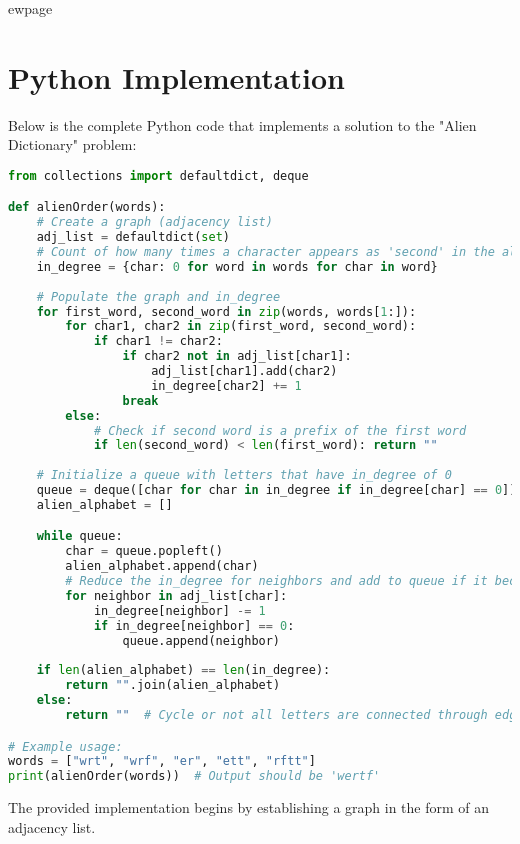 ewpage %
\section*{Python Implementation}
Below is the complete Python code that implements a solution to the "Alien Dictionary" problem:

\begin{fullwidth}
\begin{lstlisting}[language=Python]
from collections import defaultdict, deque

def alienOrder(words):
    # Create a graph (adjacency list)
    adj_list = defaultdict(set)
    # Count of how many times a character appears as 'second' in the alien dictionary order
    in_degree = {char: 0 for word in words for char in word}
    
    # Populate the graph and in_degree
    for first_word, second_word in zip(words, words[1:]):
        for char1, char2 in zip(first_word, second_word):
            if char1 != char2:
                if char2 not in adj_list[char1]:
                    adj_list[char1].add(char2)
                    in_degree[char2] += 1
                break
        else:
            # Check if second word is a prefix of the first word
            if len(second_word) < len(first_word): return ""
    
    # Initialize a queue with letters that have in_degree of 0
    queue = deque([char for char in in_degree if in_degree[char] == 0])
    alien_alphabet = []

    while queue:
        char = queue.popleft()
        alien_alphabet.append(char)
        # Reduce the in_degree for neighbors and add to queue if it becomes 0
        for neighbor in adj_list[char]:
            in_degree[neighbor] -= 1
            if in_degree[neighbor] == 0:
                queue.append(neighbor)
                
    if len(alien_alphabet) == len(in_degree):
        return "".join(alien_alphabet)
    else:
        return ""  # Cycle or not all letters are connected through edges

# Example usage:
words = ["wrt", "wrf", "er", "ett", "rftt"]
print(alienOrder(words))  # Output should be 'wertf'
\end{lstlisting}

\end{fullwidth}

The provided implementation begins by establishing a graph in the form of an adjacency list.

